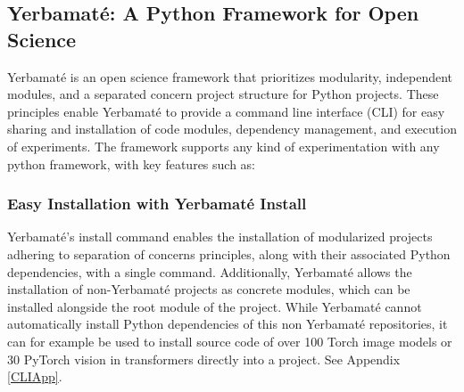 


\subsection{Yerbamaté: A Python Framework for Open Science}

Yerbamaté is an open science framework that prioritizes modularity, independent modules, and a separated concern project structure for Python projects. These principles enable Yerbamaté to provide a command line interface (CLI) for easy sharing and installation of code modules, dependency management, and execution of experiments. The framework supports any kind of experimentation with any python framework, with key features such as:

\subsubsection{Easy Installation with Yerbamaté Install}

Yerbamaté's install command enables the installation of modularized projects adhering to separation of concerns principles, along with their associated Python dependencies, with a single command. Additionally, Yerbamaté allows the installation of non-Yerbamaté projects as concrete modules, which can be installed alongside the root module of the project. While Yerbamaté cannot automatically install Python dependencies of this non Yerbamaté repositories, it can for example be used to install source code of over 100 Torch image models or 30 PyTorch vision in transformers directly into a project. See Appendix \ref{CLIApp}.

